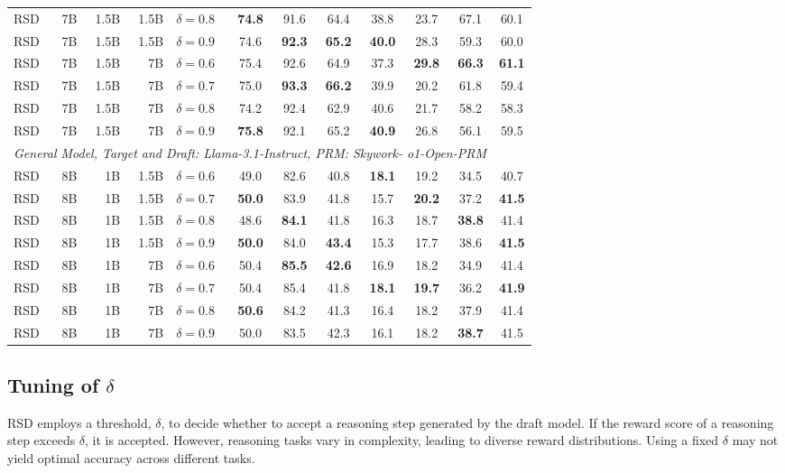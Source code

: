 \documentclass{article}
\theoremstyle{plain}
\theoremstyle{definition}
\theoremstyle{remark}
\begin{document}
\begin{table}[h!]
\begin{center}
\begin{tabular}{lrrrlccccccc}
RSD & 7B & 1.5B & 1.5B & $\delta=0.8$ & \textbf{74.8} & 91.6 & 64.4 & 38.8 & 23.7 & 67.1 & 60.1 \\
RSD & 7B & 1.5B & 1.5B & $\delta=0.9$ & 74.6 & \textbf{92.3} & \textbf{65.2} & \textbf{40.0} & 28.3 & 59.3 & 60.0 \\
\cmidrule(lr){1-12}
RSD & 7B & 1.5B & 7B & $\delta=0.6$ & 75.4 & 92.6 & 64.9 & 37.3 & \textbf{29.8} & \textbf{66.3} & \textbf{61.1} \\
RSD & 7B & 1.5B & 7B & $\delta=0.7$ & 75.0 & \textbf{93.3} & \textbf{66.2} & 39.9 & 20.2 & 61.8 & 59.4 \\
RSD & 7B & 1.5B & 7B & $\delta=0.8$ & 74.2 & 92.4 & 62.9 & 40.6 & 21.7 & 58.2 & 58.3  \\
RSD & 7B & 1.5B & 7B & $\delta=0.9$ & \textbf{75.8} & 92.1 & 65.2 & \textbf{40.9} & 26.8 & 56.1 & 59.5 \\
\midrule
\multicolumn{11}{c}{\textit{General Model, Target and Draft: Llama-3.1-Instruct, PRM: Skywork-
o1-Open-PRM}} \\
\midrule
RSD & 8B & 1B & 1.5B & $\delta=0.6$ & 49.0 & 82.6 & 40.8 & \textbf{18.1} & 19.2 & 34.5 & 40.7 \\
RSD & 8B & 1B & 1.5B & $\delta=0.7$ & \textbf{50.0} & 83.9 & 41.8 & 15.7 & \textbf{20.2} & 37.2 & \textbf{41.5} \\
RSD & 8B & 1B & 1.5B & $\delta=0.8$ & 48.6 & \textbf{84.1} & 41.8 & 16.3 & 18.7 & \textbf{38.8} & 41.4 \\
RSD & 8B & 1B & 1.5B & $\delta=0.9$ & \textbf{50.0} & 84.0 & \textbf{43.4} & 15.3 & 17.7 & 38.6 & \textbf{41.5} \\
\cmidrule(lr){1-12}
RSD & 8B & 1B & 7B & $\delta=0.6$ & 50.4 & \textbf{85.5} & \textbf{42.6} & 16.9 & 18.2 & 34.9 & 41.4 \\
RSD & 8B & 1B & 7B & $\delta=0.7$ & 50.4 & 85.4 & 41.8 & \textbf{18.1} & \textbf{19.7} & 36.2 & \textbf{41.9} \\
RSD & 8B & 1B & 7B & $\delta=0.8$ & \textbf{50.6} & 84.2 & 41.3 & 16.4 & 18.2 & 37.9 & 41.4 \\
RSD & 8B & 1B & 7B & $\delta=0.9$ & 50.0 & 83.5 & 42.3 & 16.1 & 18.2 & \textbf{38.7} & 41.5 \\
\bottomrule
\end{tabular}
\end{center}
\vskip -0.1in
\end{table}
\subsection{Tuning of $\delta$}
\label{sec:delta_tuning}
RSD employs a threshold, $\delta$, to decide whether to accept a reasoning step generated by the draft model. If the reward score of a reasoning step exceeds $\delta$, it is accepted. However, reasoning tasks vary in complexity, leading to diverse reward distributions. Using a fixed $\delta$ may not yield optimal accuracy across different tasks.
\end{document}
